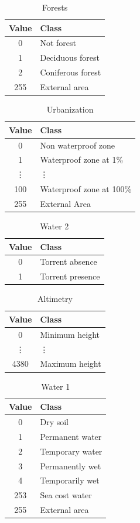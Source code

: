 \documentclass[Lau]{sapthesis} %
\begin{document}
\begin{table}[ht]
\centering
\begin{tabular}{|c|l|}
\hline
\textbf{Value} & \textbf{Class}\\
\hline
0 & Not forest\\
1 & Deciduous forest\\
2 & Coniferous forest\\
255 & External area\\
\hline
\end{tabular}
\caption{Forests}
\label{tab:forest}
\end{table}
%
\begin{table}[ht]
\centering
\begin{tabular}{|c|l|}
\hline
\textbf{Value} & \textbf{Class}\\
\hline
0 & Non waterproof zone\\
1 & Waterproof zone at 1\%\\
\vdots & \vdots\\
100 & Waterproof zone at 100\%\\
255 & External Area\\
\hline
\end{tabular}
\caption{Urbanization}
\label{tab:urbanization}
\end{table}
%
\begin{table}[ht]
\centering
\begin{tabular}{|c|l|}
\hline
\textbf{Value} & \textbf{Class}\\
\hline
0 & Torrent absence\\
1 & Torrent presence\\
\hline
\end{tabular}
\caption{Water 2}
\label{tab:water2}
\end{table}
%
\begin{table}[ht]
\centering
\begin{tabular}{|c|l|}
\hline
\textbf{Value} & \textbf{Class}\\
\hline
0 & Minimum height\\
\vdots & \vdots\\
4380 & Maximum height\\
\hline
\end{tabular}
\caption{Altimetry}
\label{tab:altimetry}
\end{table}
%
\begin{table}[ht]
\centering
\begin{tabular}{|c|l|}
\hline
\textbf{Value} & \textbf{Class}\\
\hline
0 & Dry soil\\
1 & Permanent water\\
2 & Temporary water\\
3 & Permanently wet\\
4 & Temporarily wet\\
253 & Sea cost water\\
255 & External area\\
\hline
\end{tabular}
\caption{Water 1}
\label{tab:water1}
\end{table}


\end{document}
